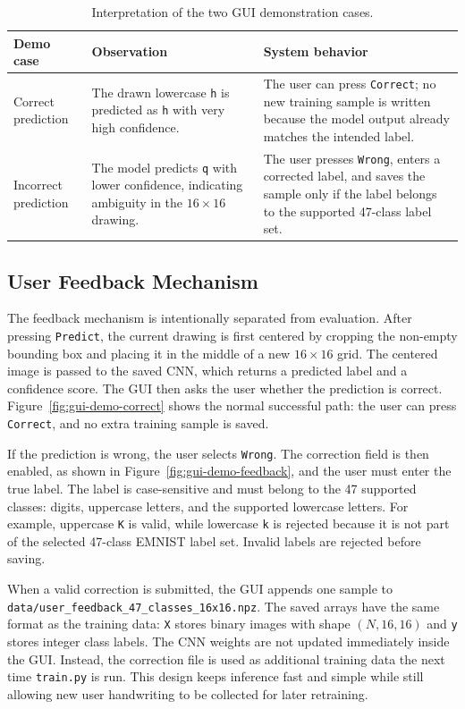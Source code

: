 \documentclass[a4paper,12pt]{extreport}
\begin{document}
\begin{table}[H]
\centering
\caption{Interpretation of the two GUI demonstration cases.}
\label{tab:gui-demo-analysis}
\begin{tabular}{p{}p{}p{}}
\toprule
Demo case & Observation & System behavior \\
\midrule
Correct prediction & The drawn lowercase \texttt{h} is predicted as \texttt{h} with very high confidence. & The user can press \texttt{Correct}; no new training sample is written because the model output already matches the intended label. \\
Incorrect prediction & The model predicts \texttt{q} with lower confidence, indicating ambiguity in the $16\times16$ drawing. & The user presses \texttt{Wrong}, enters a corrected label, and saves the sample only if the label belongs to the supported 47-class label set. \\
\bottomrule
\end{tabular}
\end{table}

\subsection*{User Feedback Mechanism}
The feedback mechanism is intentionally separated from evaluation. After pressing \texttt{Predict}, the current drawing is first centered by cropping the non-empty bounding box and placing it in the middle of a new $16\times16$ grid. The centered image is passed to the saved CNN, which returns a predicted label and a confidence score. The GUI then asks the user whether the prediction is correct. Figure~\ref{fig:gui-demo-correct} shows the normal successful path: the user can press \texttt{Correct}, and no extra training sample is saved.

If the prediction is wrong, the user selects \texttt{Wrong}. The correction field is then enabled, as shown in Figure~\ref{fig:gui-demo-feedback}, and the user must enter the true label. The label is case-sensitive and must belong to the 47 supported classes: digits, uppercase letters, and the supported lowercase letters. For example, uppercase \texttt{K} is valid, while lowercase \texttt{k} is rejected because it is not part of the selected 47-class EMNIST label set. Invalid labels are rejected before saving.

When a valid correction is submitted, the GUI appends one sample to \texttt{data/user\_feedback\_47\_classes\_16x16.npz}. The saved arrays have the same format as the training data: \texttt{X} stores binary images with shape $(N,16,16)$ and \texttt{y} stores integer class labels. The CNN weights are not updated immediately inside the GUI. Instead, the correction file is used as additional training data the next time \texttt{train.py} is run. This design keeps inference fast and simple while still allowing new user handwriting to be collected for later retraining.
\end{document}
